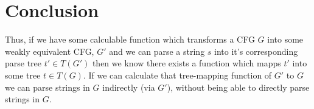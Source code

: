 \documentclass[11pt]{article}
\newtheorem{definition}{Definition}
\begin{document}

\section*{Conclusion}

Thus, if we have some calculable function which transforms a CFG $G$ into some weakly equivalent CFG, $G'$ and we can parse
a string $s$ into it's corresponding parse tree $t' \in T(G')$ then we know there exists a function
which mapps $t'$ into some tree $t \in T(G)$. If we can calculate that tree-mapping function of $G'$ to $G$
we can parse strings in $G$ indirectly (via $G'$), without being able to directly parse strings in $G$. 

{}

\end{document}

